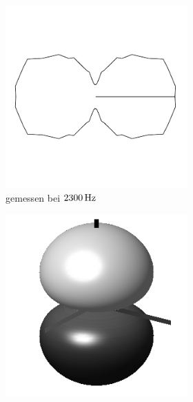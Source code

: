 \documentclass[numbers=noenddot,12pt,a4paper]{scrartcl}
\begin{document}
\begin{figure}[H]
	\centering
	\begin{subfigure}[h]{0.3\textwidth}
		\begin{subfigure}[b]{\textwidth}
			\includegraphics[angle=90,origin=c,width=\textwidth]{messwerte/polarl1.pdf}
			\caption{gemessen bei $\unit[2300]{Hz}$} \label{img:l1}
		\end{subfigure}
		\begin{subfigure}[b]{\textwidth}
			\includegraphics[width=\textwidth]{Spherical_Harmonics_deg3l1m0.png}

\end{subfigure}
\end{subfigure}
\end{figure}
\end{document}
